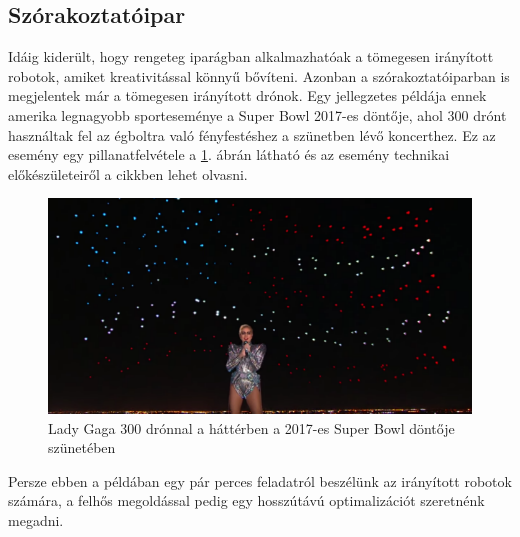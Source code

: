 \subsection{Szórakoztatóipar}
Idáig kiderült, hogy rengeteg iparágban alkalmazhatóak a tömegesen irányított robotok, amiket kreativitással könnyű bővíteni. Azonban a szórakoztatóiparban is megjelentek már a tömegesen irányított drónok. Egy jellegzetes példája ennek amerika legnagyobb sporteseménye a Super Bowl 2017-es döntője, ahol 300 drónt használtak fel az égboltra való fényfestéshez a szünetben lévő koncerthez. Ez az esemény egy pillanatfelvétele a \ref{fig:super-bowl}. ábrán látható és az esemény technikai előkészületeiről a \cite{super-bowl} cikkben lehet olvasni.
\begin{figure}
	\centering
	\includegraphics[width=\linewidth]{figures/super_bowl.png}
	\caption{Lady Gaga 300 drónnal a háttérben a 2017-es Super Bowl döntője szünetében \cite{super-bowl-pic}}
	\label{fig:super-bowl}
\end{figure}
Persze ebben a példában egy pár perces feladatról beszélünk az irányított robotok számára, a felhős megoldással pedig egy hosszútávú optimalizációt szeretnénk megadni.


